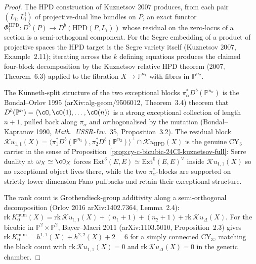 \begin{proof}
The HPD construction of Kuznetsov 2007 produces, from each pair
$(L_i, L_i^!)$ of projective-dual line bundles on $P$, an exact
functor $\Phi_i^{\mathrm{HPD}} : D^b(P) \to D^b(\mathrm{HPD}(P, L_i))$
whose residual on the zero-locus of a section is a semi-orthogonal
component. For the Segre embedding of a product of projective spaces
the HPD target is the Segre variety itself (Kuznetsov 2007,
Example~2.11); iterating across the $k$ defining equations produces
the claimed four-block decomposition by the Kuznetsov relative HPD
theorem (2007, Theorem~6.3) applied to the fibration
$X \to \mathbb P^{n_1}$ with fibres in $\mathbb P^{n_2}$.

The Künneth-split structure of the two exceptional blocks
$\pi_\alpha^* D^b(\mathbb P^{n_\alpha})$ is the Bondal--Orlov 1995
(arXiv:alg-geom/9506012, Theorem~3.4) theorem that
$D^b(\mathbb P^n) = \langle \cO, \cO(1), \ldots, \cO(n) \rangle$ is a
strong exceptional collection of length $n+1$, pulled back along
$\pi_\alpha$ and orthogonalised by the mutation
(Bondal--Kapranov 1990, \emph{Math.\ USSR-Izv.}~35, Proposition~3.2).
The residual block
$\mathcal{K}u_{1,1}(X) = \langle \pi_1^* D^b(\mathbb P^{n_1}),
\pi_2^* D^b(\mathbb P^{n_2}) \rangle^\perp \cap \mathcal{K}u_{\mathrm{HPD}}(X)$
is the genuine CY$_3$ carrier in the sense of
Proposition~\ref{prop:cy-c-bicubic-24CI-kuznetsov-full}: Serre duality
at $\omega_X \simeq \cO_X$ forces
$\mathrm{Ext}^3(E, E) \simeq \mathrm{Ext}^0(E, E)^\vee$ inside
$\mathcal{K}u_{1,1}(X)$ so no exceptional object lives there, while
the two $\pi_\alpha^*$-blocks are supported on strictly lower-dimension
Fano pullbacks and retain their exceptional structure.

The rank count is Grothendieck-group additivity along a semi-orthogonal
decomposition (Orlov 2016 arXiv:1402.7364, Lemma~2.4):
$\mathrm{rk}\, K_0^{\mathrm{num}}(X) =
\mathrm{rk}\, \mathcal{K}u_{1,1}(X) + (n_1 + 1) + (n_2 + 1) +
\mathrm{rk}\, \mathcal{K}u_\Delta(X)$.
For the bicubic in $\mathbb P^2 \times \mathbb P^2$,
Bayer--Macrì 2011 (arXiv:1103.5010, Proposition~2.3) gives
$\mathrm{rk}\, K_0^{\mathrm{num}} = h^{1,1}(X) + h^{2,2}(X) + 2 = 6$
for a simply connected CY$_3$, matching the block count with
$\mathrm{rk}\, \mathcal{K}u_{1,1}(X) = 0$ and
$\mathrm{rk}\, \mathcal{K}u_\Delta(X) = 0$ in the generic chamber.
\end{proof}

